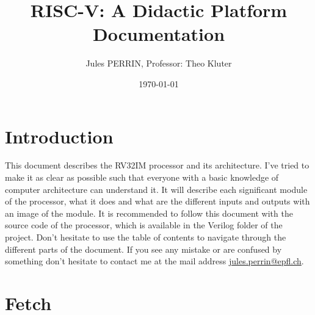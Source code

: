 \documentclass[12pt]{article}
\title{RISC-V: A Didactic Platform \\
\large Documentation}
\author{Jules PERRIN, Professor: Theo Kluter}
\date{\today}
\begin{document}
\maketitle
\tableofcontents

\section{Introduction}
This document describes the RV32IM processor and its architecture. I've tried to make it as clear 
as possible such that everyone with a basic knowledge of computer architecture can understand it.
It will describe each significant module of the processor, what it does and what are the different
inputs and outputs with an image of the module.
It is recommended to follow this document with the source code of the processor, which is available
in the Verilog folder of the project.
Don't hesitate to use the table of contents to navigate through the different parts of the document.
If you see any mistake or are confused by something don't hesitate to contact me at the mail address
\href{mailto:jules.perrin@epfl.ch}{jules.perrin@epfl.ch}.

\section{Fetch}

\end{document}

